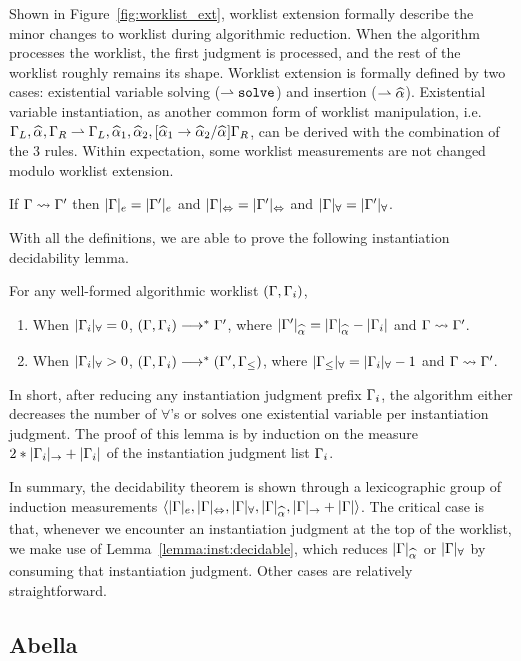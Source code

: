 Shown in Figure~\ref{fig:worklist_ext},
worklist extension formally describe the minor changes to worklist during algorithmic reduction.
When the algorithm processes the worklist, the first judgment is processed,
and the rest of the worklist roughly remains its shape.
Worklist extension is formally defined by two cases:
existential variable solving ($\mathtt{\rightharpoonup solve}$) and insertion ($\mathtt{\jExt \al}$).
Existential variable instantiation, as another common form of worklist manipulation,
i.e. $\Gm_L,\al,\Gm_R \jExt \Gm_L, \al[1], \al[2], [\al[1] \to \al[2] / \al]\Gm_R$,
can be derived with the combination of the 3 rules.
Within expectation, some worklist measurements are not changed modulo worklist extension.

\newcommand{\equivGm}[1]{|\Gm|_{#1} = |\Gm'|_{#1}}
\begin{lemma}
If $\Gamma\rightsquigarrow\Gamma'$ then $\equivGm{e}$ and $\equivGm\Leftrightarrow$ and $\equivGm\forall$.
\end{lemma}

With all the definitions, we are able to prove the following instantiation decidability lemma.

\begin{lemma}\label{lemma:inst:decidable}
For any well-formed algorithmic worklist $(\Gamma, \Gamma_i)$,
\begin{enumerate}[1)]
    \item When $|\Gamma_i|_\forall = 0$, $(\Gamma, \Gamma_i) \longrightarrow^* \Gamma'$,
        where $|\Gm'|_{\al} = |\Gm|_{\al} - |\Gm_i|$ and $\Gamma\rightsquigarrow\Gamma'$.
    \item When $|\Gamma_i|_\forall > 0$, $(\Gamma, \Gamma_i) \longrightarrow^* (\Gamma', \Gamma_\le)$,
        where $|\Gamma_\le|_\forall = |\Gamma_i|_\forall - 1$ and $\Gamma\rightsquigarrow\Gamma'$.
\end{enumerate}
\end{lemma}

In short, after reducing any instantiation judgment prefix $\Gamma_i$,
the algorithm either decreases the number of $\forall$'s
or solves one existential variable per instantiation judgment.
The proof of this lemma is by induction on the measure $2*|\Gamma_i|_\to + |\Gamma_i|$
of the instantiation judgment list $\Gamma_i$.

In summary, the decidability theorem is shown through a lexicographic group of induction measurements
$\langle |\Gm|_e, |\Gm|_\Leftrightarrow, |\Gm|_\forall, |\Gm|_{\al}, |\Gm|_\to + |\Gm| \rangle$.
The critical case is that, whenever we encounter an instantiation judgment at the top of the worklist,
we make use of Lemma~\ref{lemma:inst:decidable}, which reduces $|\Gm|_{\al}$ or $|\Gamma|_\forall$
by consuming that instantiation judgment. Other cases are relatively straightforward.

\subsection{Abella}
